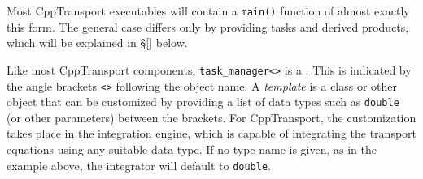 \documentclass[11pt,a4paper]{article}
\newcounter{advancedbox}[section]
\newenvironment{advanced}[1]{\stepcounter{advancedbox}\begin{tcolorbox}[enhanced,breakable,colback=red!10,colbacktitle=red!20,colframe=red!40,coltitle=black,title={Advanced usage: {#1}},fonttitle=\sffamily\fontseries{b}\selectfont]}{\end{tcolorbox}}
\newcommand{\packagefont}{\sffamily}
\newcommand{\CppTransport}{{\packagefont CppTransport}}
\newcommand{\semibold}[1]{{\fontseries{b}\selectfont{#1}}}
\begin{document}
Most {\CppTransport} executables will contain a
\texttt{main()} function of almost exactly this form.
The general case differs only by providing tasks and derived products,
which will be explained in \S\ref{} below.

\begin{advanced}{Custom integration data types}
    \label{advanced:data-type}
    Like most {\CppTransport} components,
    \texttt{task_manager<>}
    is a \semibold{template class}. This is indicated by the
    angle brackets
    \texttt{<>} following the object name.
    A \emph{template} is a class or other object that can be customized
    by providing a list of data types 
    such as \texttt{double} (or other parameters)
    between the brackets.    
    For {\CppTransport}, the customization takes place in the integration engine,
    which is capable of integrating the transport equations using any
    suitable data type.
    If no type name is given, as in the example above,
    the integrator will default to
    \texttt{double}.
    

\end{advanced}
\end{document}
